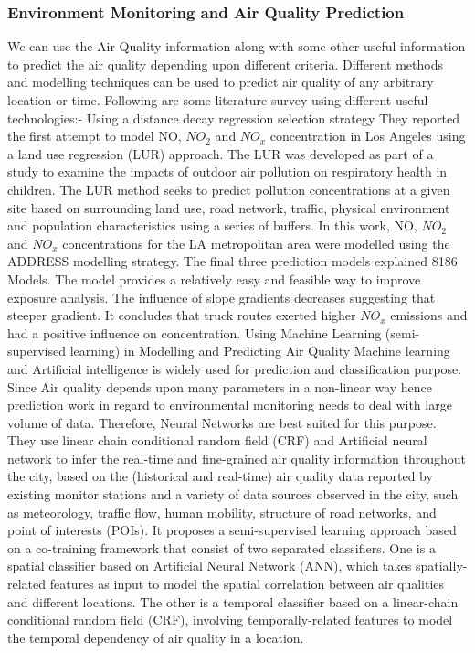 \subsubsection{Environment Monitoring and Air Quality Prediction \cite{21}}
We can use the Air Quality information along with some other useful information to predict the air quality depending upon different criteria. Different methods and modelling techniques can be used to predict air quality of any arbitrary location or time. Following are some literature survey using different useful technologies:-
Using a distance decay regression selection strategy
They reported the first attempt to model NO, $NO_2$ and $NO_x$ concentration in Los Angeles using a land use regression (LUR) approach. The LUR was developed as part of a study to examine the impacts of outdoor air pollution on respiratory health in children. The LUR method seeks to predict pollution concentrations at a given site based on surrounding land use, road network, traffic, physical environment and population characteristics using a series of buffers. In this work, NO, $NO_2$ and $NO_x$ concentrations for the LA metropolitan area were modelled using the ADDRESS modelling strategy. The final three prediction models explained 8186 Models. The model provides a relatively easy and feasible way to improve exposure analysis. The influence of slope gradients decreases suggesting that steeper gradient. It concludes that truck routes exerted higher $NO_x$ emissions and had a positive influence on concentration.
Using Machine Learning (semi-supervised learning) in Modelling and Predicting Air Quality
Machine learning and Artificial intelligence is widely used for prediction and classification purpose. Since Air quality depends upon many parameters in a non-linear way hence prediction work in regard to environmental monitoring needs to deal with large volume of data. Therefore, Neural Networks are best suited for this purpose. They use linear chain conditional random field (CRF) and Artificial neural network to infer the real-time and fine-grained air quality information throughout the city, based on the (historical and real-time) air quality data reported by existing monitor stations and a variety of data sources observed in the city, such as meteorology, traffic flow, human mobility, structure of road networks, and point of interests (POIs). It proposes a semi-supervised learning approach based on a co-training framework that consist of two separated classifiers. One is a spatial classifier based on Artificial Neural Network (ANN), which takes spatially-related features as input to model the spatial correlation between air qualities and different locations. The other is a temporal classifier based on a linear-chain conditional random field (CRF), involving temporally-related features to model the temporal dependency of air quality in a location.
